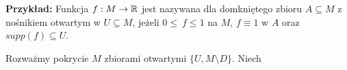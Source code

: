 
\textbf{Przykład:} Funkcja $f:M\to\mathbb{R}$ jest nazywana  dla domkniętego zbioru $A\subseteq M$ z nośnikiem otwartym w $U\subseteq M$, jeżeli $0\leq\ f\leq 1$ na $M$, $f\equiv 1$ w $A$ oraz $supp(f)\subseteq U$.

Rozważmy pokrycie $M$ zbiorami otwartymi $\{U,M\setminus D\}$. Niech













